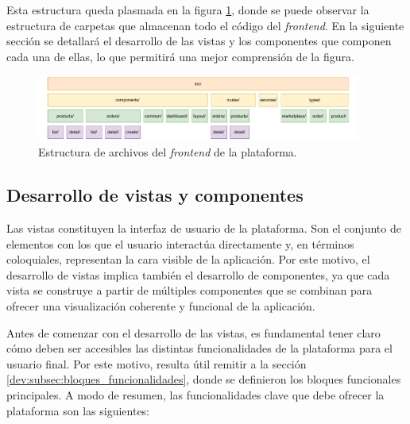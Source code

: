 Esta estructura queda plasmada en la figura \ref{fig:dev:estructura_archivos}, donde se puede observar la estructura de carpetas que almacenan todo el código del \textit{frontend}. En la siguiente sección se detallará el desarrollo de las vistas y los componentes que componen cada una de ellas, lo que permitirá una mejor comprensión de la figura.

\begin{figure}[H]
    \centering
    \includegraphics[width=0.95\textwidth]{figures/design_develop/estructura_archivos.pdf}
    \caption{Estructura de archivos del \textit{frontend} de la plataforma.}
    \label{fig:dev:estructura_archivos}
\end{figure}

\subsection{Desarrollo de vistas y componentes}
\label{dev:subsec:desarrollo_vistas_componentes}

Las vistas constituyen la interfaz de usuario de la plataforma. Son el conjunto de elementos con los que el usuario interactúa directamente y, en términos coloquiales, representan la cara visible de la aplicación. Por este motivo, el desarrollo de vistas implica también el desarrollo de componentes, ya que cada vista se construye a partir de múltiples componentes que se combinan para ofrecer una visualización coherente y funcional de la aplicación.

Antes de comenzar con el desarrollo de las vistas, es fundamental tener claro cómo deben ser accesibles las distintas funcionalidades de la plataforma para el usuario final. Por este motivo, resulta útil remitir a la sección \ref{dev:subsec:bloques_funcionalidades}, donde se definieron los bloques funcionales principales. A modo de resumen, las funcionalidades clave que debe ofrecer la plataforma son las siguientes:

